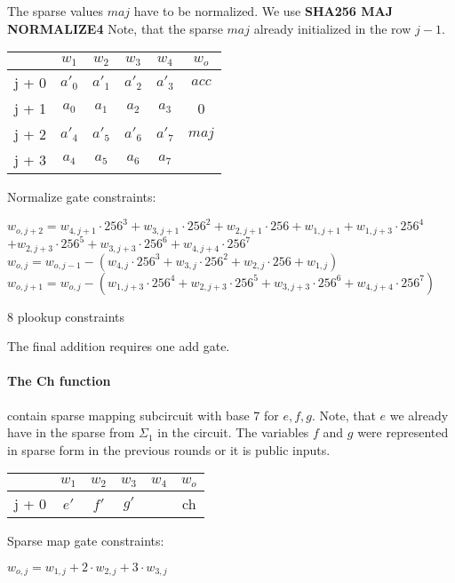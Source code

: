 The sparse values $maj$ have to be normalized.
We use \textbf{SHA256 MAJ NORMALIZE4}
Note, that the sparse $maj$ already initialized in the row $j - 1$.
\begin{center}
\begin{tabular}{ c|c|c|c|c|c} 
  & $w_1$ & $w_2$ & $w_3$ & $w_4$ & $w_o$\\ 
 \hline
j + 0 & $a'_0$ & $a'_1$ & $a'_2$ & $a'_3$ &  $acc$\\ 
j + 1 & $a_0$ & $ a_1$ & $a_2$ & $a_3$ & 0\\
j + 2 & $a'_4$ & $a'_5$ & $a'_6$ & $a'_7$ & $maj$ \\ 
j + 3 & $a_4$ & $ a_5$ & $a_6$ & $a_7$ &  \\
\end{tabular}
\end{center}

Normalize gate constraints:
\begin{center}
$w_{o,j+2} = w_{4,j+1} \cdot 256^3 + w_{3,j+1} \cdot 256^2 + w_{2,j+1} \cdot 256 + w_{1,j+1}
	+  w_{1,j+3} \cdot 256^4$ \\ 
	$+ w_{2,j+3} \cdot 256^5+ w_{3,j+3} \cdot 256^6 + w_{4,j+4} \cdot 256^7$ \\
$w_{o,j} = w_{o, j - 1} - (w_{4,j} \cdot 256^3 + w_{3,j} \cdot 256^2 + w_{2,j} \cdot 256 + w_{1,j})$ \\
$w_{o,j+1} = w_{o,j} - ( w_{1,j+3} \cdot 256^4 + w_{2,j+3} \cdot 256^5+ w_{3,j+3} \cdot 256^6 + w_{4,j+4} \cdot 256^7)$

8 plookup constraints \\
\end{center}


The final addition requires one add gate.

\paragraph{The Ch function}
contain sparse mapping subcircuit with base $7$ for $e, f ,g$.
Note, that $e$ we already have in the sparse from $\Sigma_1$ in the circuit. 
The variables $f$ and $g$ were represented in sparse form in the previous rounds or it is public inputs.
\begin{center}
\begin{tabular}{ c|c|c|c|c|c } 
  & $w_1$ & $w_2$ & $w_3$ & $w_4$ & $w_o$\\ 
 \hline 
j + 0 & $e'$ & $f'$ & $g'$ & & ch\\
\end{tabular}
\end{center}
Sparse map gate constraints:
\begin{center}
$w_{o, j} = w_{1,j} + 2 \cdot w_{2, j} + 3 \cdot w_{3, j}$ \\
\end{center}

